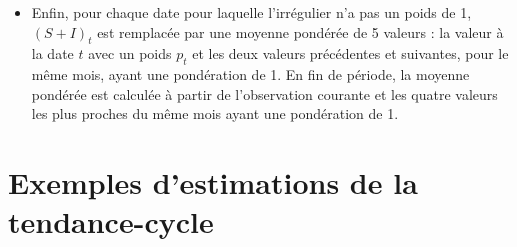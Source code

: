 \documentclass[
  11pt,
  french,
  a4paper]{article}
\providecommand{\tightlist}{%
  \setlength{\itemsep}{0pt}\setlength{\parskip}{0pt}}
\newcommand\1{\mathds{1}}
\begin{document}
\begin{itemize}
\tightlist
\item
  Enfin, pour chaque date pour laquelle l'irrégulier n'a pas un poids de 1, \((S+I)_t\) est remplacée par une moyenne pondérée de 5 valeurs : la valeur à la date \(t\) avec un poids \(p_t\) et les deux valeurs précédentes et suivantes, pour le même mois, ayant une pondération de 1.
  En fin de période, la moyenne pondérée est calculée à partir de l'observation courante et les quatre valeurs les plus proches du même mois ayant une pondération de 1.
\end{itemize}

\newpage

\hypertarget{an-plotseries}{%
\section{Exemples d'estimations de la tendance-cycle}\label{an-plotseries}}
\end{document}
